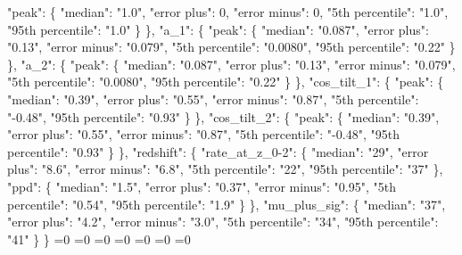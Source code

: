 {{        "peak": \{%
          "median": "1.0", %
          "error plus": 0, %
          "error minus": 0, %
          "5th percentile": "1.0", %
          "95th percentile": "1.0"%
        \}%
      \}, %
      "a\_1": \{%
        "peak": \{%
          "median": "0.087", %
          "error plus": "0.13", %
          "error minus": "0.079", %
          "5th percentile": "0.0080", %
          "95th percentile": "0.22"%
        \}%
      \}, %
      "a\_2": \{%
        "peak": \{%
          "median": "0.087", %
          "error plus": "0.13", %
          "error minus": "0.079", %
          "5th percentile": "0.0080", %
          "95th percentile": "0.22"%
        \}%
      \}, %
      "cos\_tilt\_1": \{%
        "peak": \{%
          "median": "0.39", %
          "error plus": "0.55", %
          "error minus": "0.87", %
          "5th percentile": "{-}0.48", %
          "95th percentile": "0.93"%
        \}%
      \}, %
      "cos\_tilt\_2": \{%
        "peak": \{%
          "median": "0.39", %
          "error plus": "0.55", %
          "error minus": "0.87", %
          "5th percentile": "{-}0.48", %
          "95th percentile": "0.93"%
        \}%
      \}, %
      "redshift": \{%
        "rate\_at\_z\_0{-}2": \{%
          "median": "29", %
          "error plus": "8.6", %
          "error minus": "6.8", %
          "5th percentile": "22", %
          "95th percentile": "37"%
        \}, %
        "ppd": \{%
          "median": "1.5", %
          "error plus": "0.37", %
          "error minus": "0.95", %
          "5th percentile": "0.54", %
          "95th percentile": "1.9"%
        \}%
      \}, %
      "mu\_plus\_sig": \{%
        "median": "37", %
        "error plus": "4.2", %
        "error minus": "3.0", %
        "5th percentile": "34", %
        "95th percentile": "41"%
      \}%
    \}}%
  \else%
    \ifnum{}=0%
      \let\DefaultBBHDominantMode@out\DefaultBBHDominantMode@I%
    \else%
      \ifnum{}=0%
      \let\DefaultBBHDominantMode@out\DefaultBBHDominantMode@II%
    \else%
      \ifnum{}=0%
      \let\DefaultBBHDominantMode@out\DefaultBBHDominantMode@III%
    \else%
      \ifnum{}=0%
      \let\DefaultBBHDominantMode@out\DefaultBBHDominantMode@IV%
    \else%
      \ifnum{}=0%
      \let\DefaultBBHDominantMode@out\DefaultBBHDominantMode@V%
    \else%
      \ifnum{}=0%
      \let\DefaultBBHDominantMode@out\DefaultBBHDominantMode@VI%
    \else%
      \ifnum{}=0%
      \let\DefaultBBHDominantMode@out\DefaultBBHDominantMode@VII%
}
